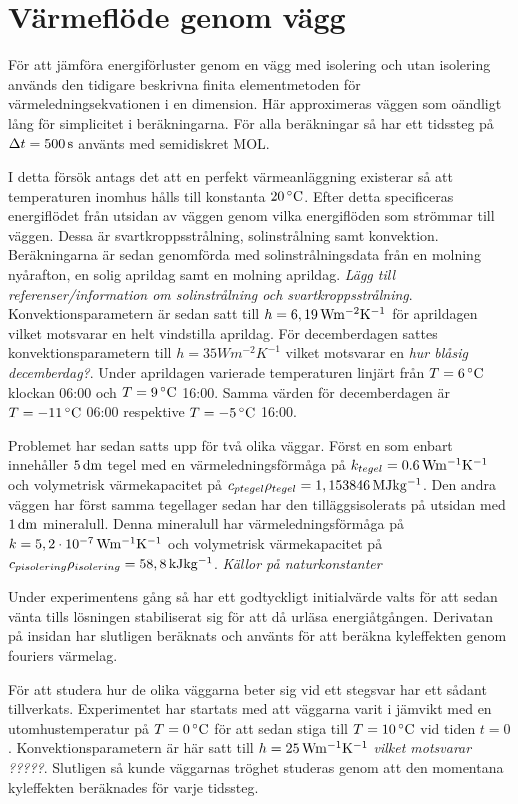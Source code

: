 \section{Värmeflöde genom vägg}

För att jämföra energiförluster genom en vägg med isolering och utan isolering används
den tidigare beskrivna finita elementmetoden för värmeledningsekvationen i en dimension. Här approximeras
väggen som oändligt lång för simplicitet i beräkningarna. För alla beräkningar så har ett tidssteg
på $\Delta t = \unit[500]{s}$ använts med semidiskret MOL.

I detta försök antags det att en perfekt värmeanläggning
existerar så att temperaturen inomhus hålls till konstanta $\unit[20]{^\circ C}$. Efter detta specificeras energiflödet
från utsidan av väggen genom vilka energiflöden som strömmar till väggen. Dessa är svartkroppsstrålning, solinstrålning
samt konvektion. Beräkningarna är sedan genomförda med solinstrålningsdata från en molning nyårafton,
en solig aprildag samt en molning aprildag.\emph{\color{red} Lägg till referenser/information om solinstrålning och svartkroppsstrålning}.
Konvektionsparametern är sedan satt till $h=\unit[6,19]{Wm^{-2}K^{-1}}$ för aprildagen vilket motsvarar en helt vindstilla aprildag.
För decemberdagen sattes konvektionsparametern till $h=\unit{35}{Wm^{-2}K^{-1}}$ vilket motsvarar en
\emph{ \color{red} hur blåsig decemberdag?}.
Under aprildagen varierade temperaturen linjärt från $T=\unit[6]{^\circ C}$ klockan 06:00 och $T=\unit[9]{^\circ C}$ 16:00.
Samma värden för decemberdagen är $T = \unit[-11]{^\circ C}$ 06:00 respektive $T=\unit[-5]{^\circ C}$ 16:00.

Problemet har sedan satts upp för två olika väggar. Först en som enbart innehåller $\unit[5]{dm}$ tegel med
en värmeledningsförmåga på $k_{tegel} = \unit[0.6]{Wm^{-1}K^{-1}}$ och volymetrisk värmekapacitet på
$c_{p tegel}\rho_{tegel} = \unit[1,153846]{MJ kg^{-1}}$. Den andra väggen har först samma tegellager sedan
har den tilläggsisolerats på utsidan med $\unit[1]{dm}$ mineralull. Denna mineralull har värmeledningsförmåga på
$k = \unit[5,2\cdot 10^{-7}]{Wm^{-1}K^{-1}}$ och volymetrisk värmekapacitet på
$c_{p isolering}\rho_{isolering} = \unit[58,8]{kJ kg^{-1}}$.
\emph{\color{red} Källor på naturkonstanter}

Under experimentens gång så har ett godtyckligt initialvärde valts för att sedan vänta tills
lösningen stabiliserat sig för att då urläsa energiåtgången. Derivatan på insidan har slutligen beräknats
och använts för att beräkna kyleffekten genom fouriers värmelag.

För att studera hur de olika väggarna beter sig vid ett stegsvar har ett sådant tillverkats. Experimentet
har startats med att väggarna varit i jämvikt med en utomhustemperatur på $T = \unit[0]{^\circ C}$ för att
sedan stiga till $T = \unit[10]{^\circ C}$ vid tiden $t=0$. Konvektionsparametern är här satt till
$h = \unit[25]{W m^{-1}K^{-1}}$ \emph{\color{red} vilket motsvarar ?????}. Slutligen så kunde väggarnas
tröghet studeras genom att den momentana kyleffekten beräknades för varje tidssteg. 
